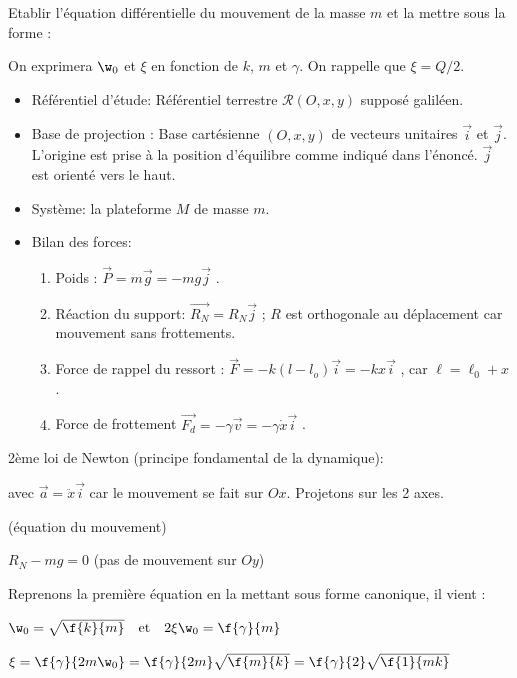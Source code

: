 \documentclass[a4paper, 10pt, garamond]{book}
\begin{document}
\QR
{Etablir l’équation différentielle du mouvement de la masse $m$ et la mettre sous la forme :


\noindent
On exprimera $\w_0$ et $\xi$ en fonction de $k$, $m$ et $\gamma$. On rappelle que $\xi =Q/2$.}
{
\begin{itemize}
\item Référentiel d'étude: Référentiel terrestre $\mathcal{R}(O, x, y)$ supposé galiléen.
\item Base de projection : Base cartésienne $(O, x, y)$ de vecteurs unitaires $\vec{i}$ et $\vec{j}$. L'origine est prise à la position d'équilibre comme indiqué dans l’énoncé. $\vec{j}$ est orienté vers le haut.
\item Système: la plateforme $M$ de masse $m$. 
\item Bilan des forces: 
\begin{enumerate}
\item Poids : $\vec{P}=m\vec{g} = - mg\vec{j}$ .
\item Réaction du support: $\vec{R_N}=R_N\vec{j}$ ; $R$ est orthogonale au déplacement car mouvement sans frottements.
\item Force de rappel du ressort : $\vec{F}= - k \left(l-l_o\right)\vec{i} = - k x \vec{i}$ , car $\ell = \ell_0 + x$.
\item Force de frottement $\vec{F_d}=-\gamma\vec{v}=-\gamma\dot{x}\vec{i}$ .
\end{enumerate}	
\end{itemize}

2ème loi de Newton (principe fondamental de la dynamique):

	
	
	\noindent
	avec $\vec{a}=\ddot{x}\vec{i}$ car le mouvement se fait sur $Ox$.
	Projetons sur les 2 axes.
	
	 	{(équation du mouvement)}
	 
       {$R_N- mg = 0$} {(pas de mouvement sur $Oy$)}
      
      \noindent
Reprenons la première équation en la mettant sous forme canonique, il vient : 



 
 {$\w_0=\sqrt{\f{k}{m}} \quad \text{et} \quad 2\xi\w_0=\f{\gamma}{m}$}

 {$\xi=\f{\gamma}{2m\w_0}=\f{\gamma}{2m}\sqrt{\f{m}{k}} = \f{\gamma}{2}\sqrt{\f{1}{mk}}$}
}
\end{document}
